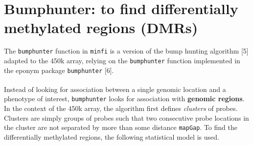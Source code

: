 \documentclass[12pt]{article}
\begin{document}
\section{Bumphunter: to find differentially methylated regions (DMRs)}
The \texttt{bumphunter} function in \texttt{minfi} is a version of the bump hunting algorithm [5] adapted to the 450k array, relying on the \texttt{bumphunter} function implemented in the eponym package \texttt{bumphunter} [6]. \\
\\
Instead of looking for association between a single genomic location and a phenotype of interest, \texttt{bumphunter} looks for association with \textbf{genomic regions}. In the context of the 450k array, the algorithm first defines \textit{clusters} of probes. Clusters are simply groups of probes such that two consecutive probe locations in the cluster are not separated by more than some distance \texttt{mapGap}. To find the differentially methylated regions, the following statistical model is used.
\end{document}
